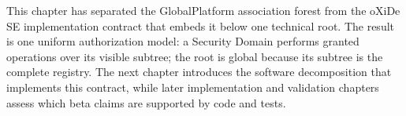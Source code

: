 
This chapter has separated the GlobalPlatform association forest from the
oXiDe SE implementation contract that embeds it below one technical root. The
result is one uniform authorization model: a Security Domain performs granted
operations over its visible subtree; the root is global because its subtree is
the complete registry. The next chapter introduces the software decomposition
that implements this contract, while later implementation and validation
chapters assess which beta claims are supported by code and tests.

